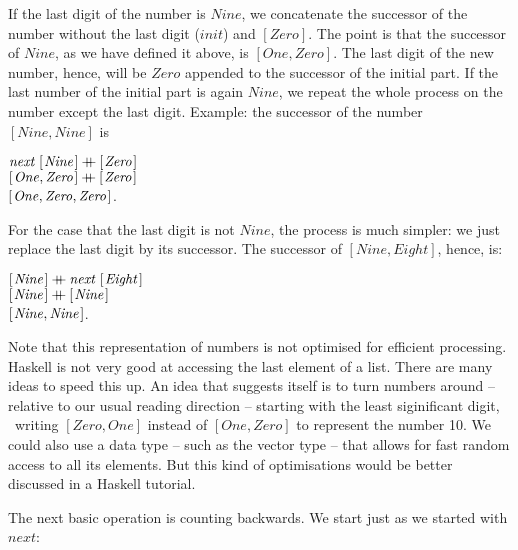 \documentclass{scrreprt}
\newcommand{\Conid}[1]{\mathit{#1}}
\newcommand{\Varid}[1]{\mathit{#1}}
\newcommand{\plus}{\mathbin{+\!\!\!+}}
\begin{document}
If the last digit of the number
is $Nine$, we concatenate the successor
of the number without the last digit (\ensuremath{\Varid{init}})
and $[Zero]$.
The point is that
the successor of $Nine$,
as we have defined it above,
is $[One,Zero]$.
The last digit of the new number,
hence, will be $Zero$
appended to the successor of the initial part.
If the last number of the initial part
is again $Nine$,
we repeat the whole process on
the number except the last digit.
Example: the successor of the number $[Nine,Nine]$
is

\begin{minipage}{\textwidth}
\ensuremath{\Varid{next}\;[\mskip1.5mu \Conid{Nine}\mskip1.5mu]\plus [\mskip1.5mu \Conid{Zero}\mskip1.5mu]}\\
\ensuremath{[\mskip1.5mu \Conid{One},\Conid{Zero}\mskip1.5mu]\plus [\mskip1.5mu \Conid{Zero}\mskip1.5mu]}\\ 
\ensuremath{[\mskip1.5mu \Conid{One},\Conid{Zero},\Conid{Zero}\mskip1.5mu]}.
\end{minipage}

For the case that the last digit is not $Nine$,
the process is much simpler:
we just replace the last digit by its successor.
The successor of $[Nine,Eight]$, hence, is:

\begin{minipage}{\textwidth}
\ensuremath{[\mskip1.5mu \Conid{Nine}\mskip1.5mu]\plus \Varid{next}\;[\mskip1.5mu \Conid{Eight}\mskip1.5mu]}\\
\ensuremath{[\mskip1.5mu \Conid{Nine}\mskip1.5mu]\plus [\mskip1.5mu \Conid{Nine}\mskip1.5mu]}\\
\ensuremath{[\mskip1.5mu \Conid{Nine},\Conid{Nine}\mskip1.5mu]}.
\end{minipage}

Note that this representation of numbers
is not optimised for efficient processing.
Haskell is not very good at accessing the last
element of a list. There are many ideas
to speed this up.
An idea that suggests itself
is to turn numbers around 
-- relative to our usual reading direction -- 
starting with the least siginificant digit,
\eg\ writing $[Zero,One]$ instead of $[One,Zero]$
to represent the number 10.
We could also use a data type 
-- such as the vector type --
that allows for fast random access to all its elements.
But this kind of optimisations would be better discussed
in a Haskell tutorial.

The next basic operation
is counting backwards.
We start just as we started with $next$:
\end{document}

